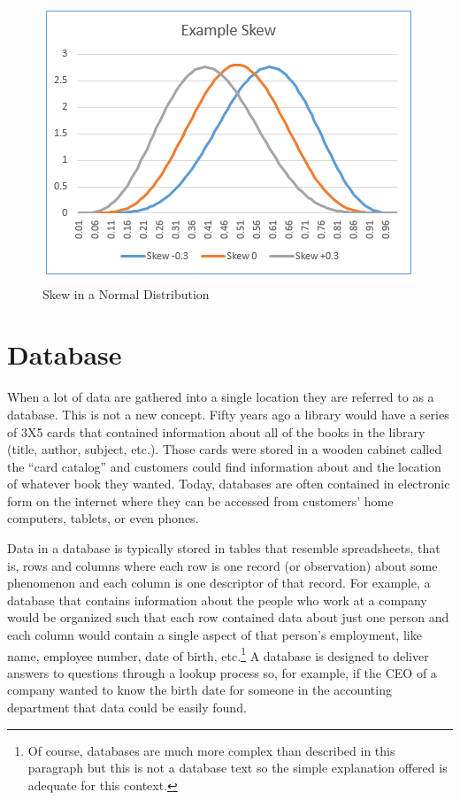 \begin{figure}[H]
	\centering
	\includegraphics[width=\maxwidth{.95\linewidth}]{gfx/05-03}
	\caption{Skew in a Normal Distribution}
	\label{fig05-03}
\end{figure}

\section{Database}

When a lot of data are gathered into a single location they are referred to as a database. This is not a new concept. Fifty years ago a library would have a series of 3X5 cards that contained information about all of the books in the library (title, author, subject, etc.). Those cards were stored in a wooden cabinet called the ``card catalog'' and customers could find information about and the location of whatever book they wanted. Today, databases are often contained in electronic form on the internet where they can be accessed from customers' home computers, tablets, or even phones.

Data in a database is typically stored in tables that resemble spreadsheets, that is, rows and columns where each row is one record (or observation) about some phenomenon and each column is one descriptor of that record. For example, a database that contains information about the people who work at a company would be organized such that each row contained data about just one person and each column would contain a single aspect of that person's employment, like name, employee number, date of birth, etc.\footnote{Of course, databases are much more complex than described in this paragraph but this is not a database text so the simple explanation offered is adequate for this context.} A database is designed to deliver answers to questions through a lookup process so, for example, if the CEO of a company wanted to know the birth date for someone in the accounting department that data could be easily found. 

